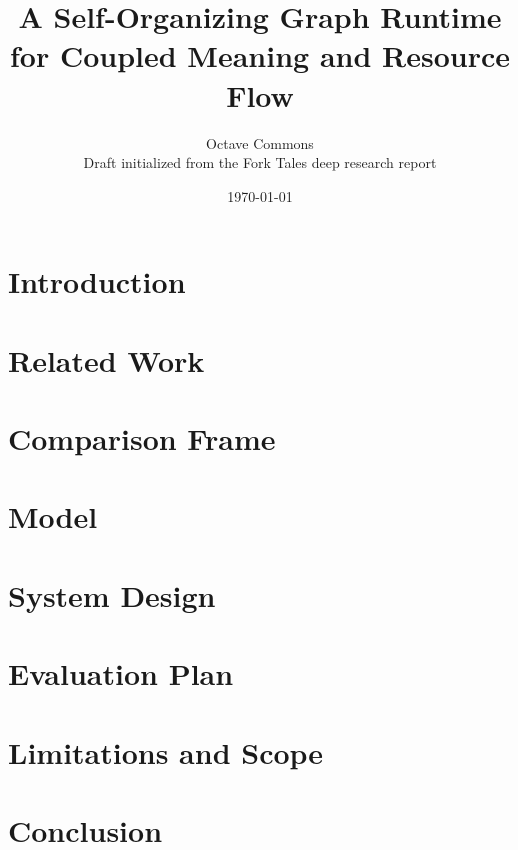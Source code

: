 \documentclass[11pt]{article}
\title{A Self-Organizing Graph Runtime for Coupled Meaning and Resource Flow}
\author{Octave Commons\\\normalsize Draft initialized from the Fork Tales deep research report}
\date{\today}
\begin{document}
\maketitle

\begin{abstract}

\end{abstract}

\section{Introduction}


\section{Related Work}


\section{Comparison Frame}


\section{Model}


\section{System Design}


\section{Evaluation Plan}


\section{Limitations and Scope}


\section{Conclusion}




\end{document}
